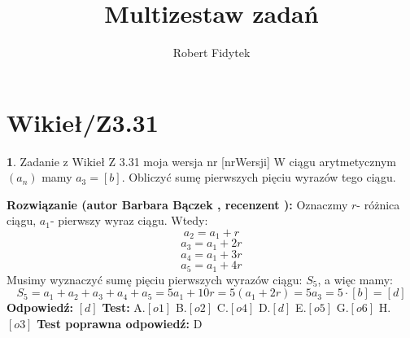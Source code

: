 \documentclass[12pt, a4paper]{article}
\title{Multizestaw zadań}
\author{Robert Fidytek}
\date{}
\theoremstyle{definition} %
\newtheorem{zad}{}
\newcommand{\kategoria}[1]{\section{#1}} %
\newcommand{\zadStart}[1]{\begin{zad}#1\newline} %
\newcommand{\zadStop}{\end{zad}}   %
\newcommand{\rozwStart}[2]{\noindent \textbf{Rozwiązanie (autor #1 , recenzent #2): }\newline} %
\newcommand{\rozwStop}{\newline}                                            %
\newcommand{\odpStart}{\noindent \textbf{Odpowiedź:}\newline}    %
\newcommand{\odpStop}{\newline}                                             %
\newcommand{\testStart}{\noindent \textbf{Test:}\newline} %
\newcommand{\testStop}{\newline} %
\newcommand{\kluczStart}{\noindent \textbf{Test poprawna odpowiedź:}\newline} %
\newcommand{\kluczStop}{\newline} %
\begin{document}
\maketitle


\kategoria{Wikieł/Z3.31}
\zadStart{Zadanie z Wikieł Z 3.31 moja wersja nr [nrWersji]}
W ciągu arytmetycznym $(a_n)$ mamy $a_3=[b]$. Obliczyć sumę pierwszych pięciu wyrazów tego ciągu.
\zadStop
\rozwStart{Barbara Bączek}{}
Oznaczmy $r$- różnica ciągu, $a_1$- pierwszy wyraz ciągu. Wtedy:
$$a_2=a_1+r$$
$$a_3=a_1+2r$$
$$a_4=a_1+3r$$
$$a_5=a_1+4r$$
Musimy wyznaczyć sumę pięciu pierwszych wyrazów ciągu: $S_5$, a więc mamy:
$$S_5=a_1+a_2+a_3+a_4+a_5= 5a_1 + 10r= 5(a_1 +2r)= 5 a_3= 5 \cdot [b] = [d]$$
\rozwStop
\odpStart
$[d]$
\odpStop
\testStart
A.$[o1]$
B.$[o2]$
C.$[o4]$
D.$[d]$
E.$[o5]$
G.$[o6]$
H.$[o3]$
\testStop
\kluczStart
D
\kluczStop
\end{document}
